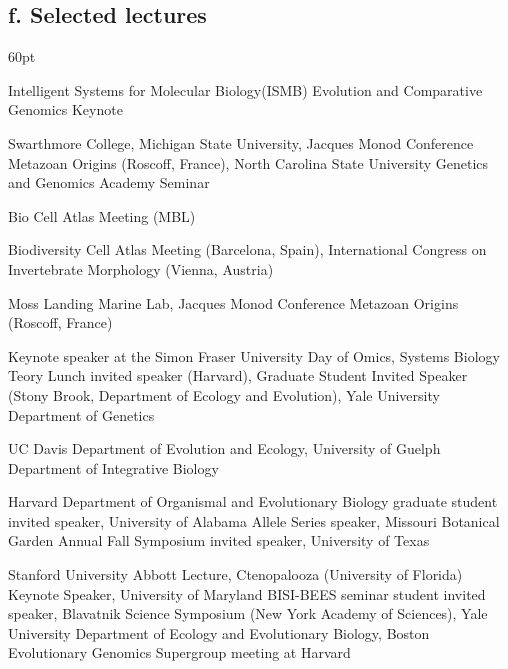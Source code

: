
\subsection*{f. Selected lectures}

\begin{entry}{60pt}

\item [\rm 2026] Intelligent Systems for Molecular Biology(ISMB) Evolution and Comparative Genomics Keynote

\item [\rm 2025] Swarthmore College, Michigan State University, Jacques Monod Conference Metazoan Origins (Roscoff, France), North Carolina State University Genetics and Genomics Academy Seminar

\item [\rm 2024] Bio Cell Atlas Meeting (MBL)

\item [\rm 2023] Biodiversity Cell Atlas Meeting (Barcelona, Spain), International Congress on Invertebrate Morphology (Vienna, Austria)

\item [\rm 2022] Moss Landing Marine Lab, Jacques Monod Conference Metazoan Origins (Roscoff, France)

\item [\rm 2019] Keynote speaker at the Simon Fraser University Day of Omics, Systems Biology Teory Lunch invited speaker (Harvard), Graduate Student Invited Speaker (Stony Brook, Department of Ecology and Evolution), Yale University Department of Genetics

\item [\rm 2018] UC Davis Department of Evolution and Ecology, University of Guelph Department of Integrative Biology

\item [\rm 2017] Harvard Department of Organismal and Evolutionary Biology graduate student invited speaker, University of Alabama Allele Series speaker, Missouri Botanical Garden Annual Fall Symposium invited speaker, University of Texas

\item [\rm 2016] Stanford University Abbott Lecture, Ctenopalooza (University of Florida) Keynote Speaker, University of Maryland BISI-BEES seminar student invited speaker, Blavatnik Science Symposium (New York Academy of Sciences), Yale University Department of Ecology and Evolutionary Biology, Boston Evolutionary Genomics Supergroup meeting at Harvard


\end{entry}
